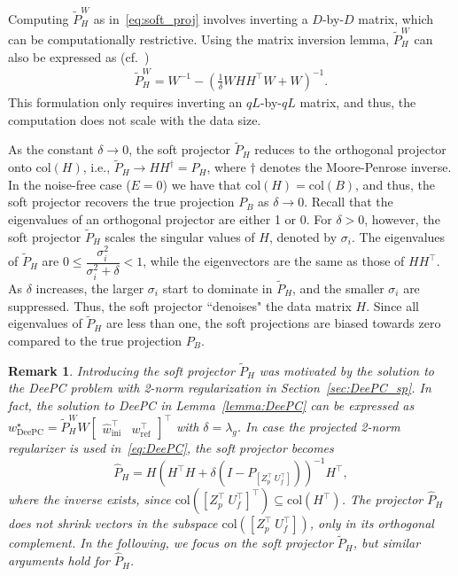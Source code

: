\documentclass[letterpaper, 10 pt, conference]{ieeeconf}
\newtheorem{rmk}{Remark}
\begin{document}
Computing $\tilde{P}_H^W$ as in~\eqref{eq:soft_proj} involves inverting a $D$-by-$D$ matrix, which can be computationally restrictive. 
Using the matrix inversion lemma, $\tilde{P}_H^W$ can also be expressed as (cf.~\cite{wax2023robust})
\begin{align} \label{eq:soft_proj_covariance}
    \tilde{P}_H^W = W^{-1} - \left(\frac{1}{\delta}WHH^\top W + W\right)^{-1}.
\end{align}
This formulation only requires inverting an $qL$-by-$qL$ matrix, and thus, the computation does not scale with the data size.


As the constant $\delta\to 0$, the soft projector $\tilde{P}_H$ reduces to the orthogonal projector onto $\mathrm{col}(H)$, i.e., $\tilde{P}_H \to HH^\dagger = P_H$, where $\dagger$ denotes the Moore-Penrose inverse.
In the noise-free case ($E=0$) we have that $\mathrm{col}(H) = \mathrm{col}(B)$, and thus, the soft projector recovers the true projection $P_B$ as $\delta\to0$.
Recall that the eigenvalues of an orthogonal projector are either 1 or 0.
For $\delta>0$, however, the soft projector $\tilde{P}_H$ scales the singular values of $H$, denoted by $\sigma_i$.
The eigenvalues of $\tilde{P}_H$ are $0\leq\dfrac{\sigma_i^2}{\sigma_i^2 + \delta}<1$, while the eigenvectors are the same as those of $HH^\top$.
As $\delta$ increases, the larger $\sigma_i$ start to dominate in $\tilde{P}_H$, and the smaller $\sigma_i$ are suppressed.
Thus, the soft projector ``denoises" the data matrix $H$.
Since all eigenvalues of $\tilde{P}_H$ are less than one, the soft projections are biased towards zero compared to the true projection $P_B$.



\begin{rmk} \label{rmk:DeePC_explicit_sol}
Introducing the soft projector $\tilde{P}_H$ was motivated by the solution to the \gls{DeePC} problem with 2-norm regularization in Section~\ref{sec:DeePC_sp}.
In fact, the solution to \gls{DeePC} in Lemma~\ref{lemma:DeePC} can be expressed as $w^\star_\mathrm{DeePC} = \tilde{P}^W_H W\begin{bmatrix}
    \hat{w}_\mathrm{ini}^\top & w_\mathrm{ref}^\top
\end{bmatrix}^\top$ with $\delta = \lambda_g$.
In case the projected 2-norm regularizer is used in~\eqref{eq:DeePC}, the soft projector becomes
$$
\hat{P}_H = H\left(H^\top H + \delta(I-P_{[Z_p^\top~U_f^\top]})\right)^{-1} H^\top,
$$
where the inverse exists, since {$\mathrm{col}([Z_p^\top~U_f^\top]^\top) \subseteq \mathrm{col}(H^\top)$}.
The projector $\hat{P}_H$ does not shrink vectors in the subspace $\mathrm{col}([Z_p^\top~U_f^\top])$, only in its orthogonal complement.
In the following, we focus on the soft projector $\tilde{P}_H$, but similar arguments hold for $\hat{P}_H$. \hfill \QED
\end{rmk}
\end{document}
